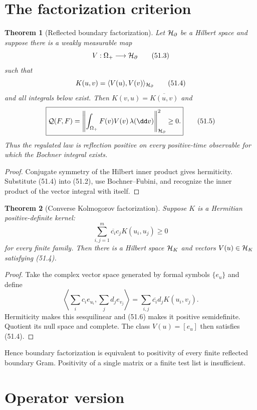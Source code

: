 \documentclass[11pt]{article}
\newtheorem{theorem}{Theorem}[section]
\theoremstyle{remark}
\begin{document}
\section{The factorization criterion}

\begin{theorem}[Reflected boundary factorization]
\label{thm:v15v51-factorization}
Let \({\cal H}_\partial\) be a Hilbert space and suppose there is a
weakly measurable map
\[
 V:\Omega_+\longrightarrow{\cal H}_\partial             \tag{51.3}
\]
such that
\[
 K(u,v)=\langle V(u),V(v)\rangle_{{\cal H}_\partial}    \tag{51.4}
\]
and all integrals below exist.  Then \(K(v,u)=\overline{K(u,v)}\)
and
\[
 \boxed{
 {\cal Q}(F,F)=
 \left\|\int_{\Omega_+}F(v)V(v)\,\lambda(\dd v)
 \right\|_{{\cal H}_\partial}^2\geq0.}                  \tag{51.5}
\]
Thus the regulated law is reflection positive on every
positive-time observable for which the Bochner integral exists.
\end{theorem}

\begin{proof}
Conjugate symmetry of the Hilbert inner product gives hermiticity.
Substitute (51.4) into (51.2), use Bochner--Fubini, and recognize the
inner product of the vector integral with itself.
\end{proof}

\begin{theorem}[Converse Kolmogorov factorization]
\label{thm:v15v51-converse}
Suppose \(K\) is a Hermitian positive-definite kernel:
\[
 \sum_{i,j=1}^m\overline{c_i}c_jK(u_i,u_j)\geq0         \tag{51.6}
\]
for every finite family.  Then there is a Hilbert space
\({\cal H}_K\) and vectors \(V(u)\in{\cal H}_K\) satisfying
(51.4).
\end{theorem}

\begin{proof}
Take the complex vector space generated by formal symbols
\(\{e_u\}\) and define
\[
 \left\langle\sum_ic_ie_{u_i},\sum_jd_je_{v_j}\right\rangle
 =\sum_{i,j}\overline{c_i}d_jK(u_i,v_j).                \tag{51.7}
\]
Hermiticity makes this sesquilinear and (51.6) makes it positive
semidefinite.  Quotient its null space and complete.  The class
\(V(u)=[e_u]\) then satisfies (51.4).
\end{proof}

Hence boundary factorization is equivalent to positivity of every
finite reflected boundary Gram.  Positivity of a single matrix or a
finite test list is insufficient.

\section{Operator version}
\end{document}
